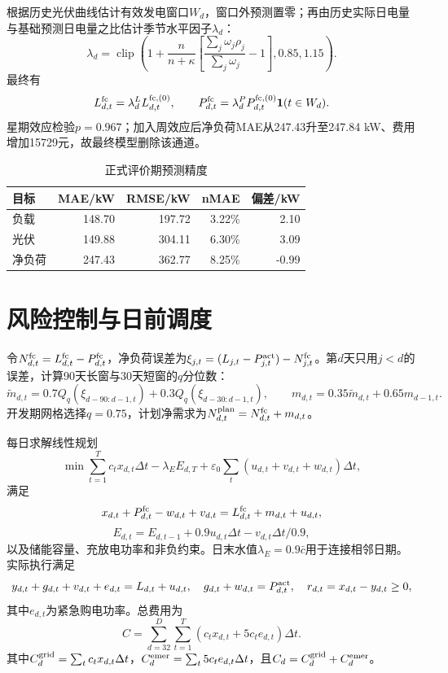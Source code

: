 \documentclass[UTF8,12pt]{ctexart}
\begin{document}
根据历史光伏曲线估计有效发电窗口$W_d$，窗口外预测置零；再由历史实际日电量与基础预测日电量之比估计季节水平因子$\lambda_d$：
\[
\lambda_d=\operatorname{clip}\left(1+\frac{n}{n+\kappa}
\left[\frac{\sum_j\omega_j\rho_j}{\sum_j\omega_j}-1\right],0.85,1.15\right).
\]
最终有
\[
L_{d,t}^{\rm fc}=\lambda_d^L L_{d,t}^{\rm fc,(0)},\qquad
P_{d,t}^{\rm fc}=\lambda_d^P P_{d,t}^{\rm fc,(0)}\mathbf1(t\in W_d).
\]
星期效应检验$p=0.967$；加入周效应后净负荷MAE从247.43升至247.84 kW、费用增加15729元，故最终模型删除该通道。

\begin{table}[H]\centering
\caption{正式评价期预测精度}
\begin{tabular}{lrrrr}\toprule
目标 & MAE/kW & RMSE/kW & nMAE & 偏差/kW\\\midrule
负载 & 148.70 & 197.72 & 3.22\% & 2.10\\
光伏 & 149.88 & 304.11 & 6.30\% & 3.09\\
净负荷 & 247.43 & 362.77 & 8.25\% & -0.99\\\bottomrule
\end{tabular}
\end{table}

\section{风险控制与日前调度}
令$N_{d,t}^{\rm fc}=L_{d,t}^{\rm fc}-P_{d,t}^{\rm fc}$，净负荷误差为$\xi_{j,t}=(L_{j,t}-P_{j,t}^{\rm act})-N_{j,t}^{\rm fc}$。第$d$天只用$j<d$的误差，计算90天长窗与30天短窗的$q$分位数：
\[
\widetilde m_{d,t}=0.7Q_q(\xi_{d-90:d-1,t})+0.3Q_q(\xi_{d-30:d-1,t}),\qquad
m_{d,t}=0.35\widetilde m_{d,t}+0.65m_{d-1,t}.
\]
开发期网格选择$q=0.75$，计划净需求为$N_{d,t}^{\rm plan}=N_{d,t}^{\rm fc}+m_{d,t}$。

每日求解线性规划
\[
\min \sum_{t=1}^{T}c_tx_{d,t}\Delta t-\lambda_EE_{d,T}
+\varepsilon_0\sum_t(u_{d,t}+v_{d,t}+w_{d,t})\Delta t,
\]
满足
\[
x_{d,t}+P_{d,t}^{\rm fc}-w_{d,t}+v_{d,t}
=L_{d,t}^{\rm fc}+m_{d,t}+u_{d,t},
\]
\[
E_{d,t}=E_{d,t-1}+0.9u_{d,t}\Delta t-v_{d,t}\Delta t/0.9,
\]
以及储能容量、充放电功率和非负约束。日末水值$\lambda_E=0.9\bar c$用于连接相邻日期。实际执行满足
\[
y_{d,t}+g_{d,t}+v_{d,t}+e_{d,t}=L_{d,t}+u_{d,t},\quad
g_{d,t}+w_{d,t}=P_{d,t}^{\rm act},\quad
r_{d,t}=x_{d,t}-y_{d,t}\ge0,
\]
其中$e_{d,t}$为紧急购电功率。总费用为
\[
C=\sum_{d=32}^{D}\sum_{t=1}^{T}(c_tx_{d,t}+5c_te_{d,t})\Delta t.
\]
其中$C_d^{\rm grid}=\sum_t c_tx_{d,t}\Delta t$，$C_d^{\rm emer}=\sum_t5c_te_{d,t}\Delta t$，且$C_d=C_d^{\rm grid}+C_d^{\rm emer}$。
\end{document}
